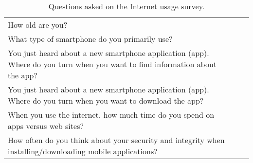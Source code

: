 \begin{table}[ht!]
    \centering
    \begin{tabularx}{0.9\textwidth} { 
        | >{\raggedright\arraybackslash}X 
        | >{\centering\arraybackslash}X 
        | >{\raggedleft\arraybackslash}X | }
        \hline
        How old are you? \\
        What type of smartphone do you primarily use? \\
        You just heard about a new smartphone application (app). Where do you turn when you want to find information about the app? \\
        You just heard about a new smartphone application (app). Where do you turn when you want to download the app? \\
        When you use the internet, how much time do you spend on apps versus web sites? \\
        How often do you think about your security and integrity when installing/downloading mobile applications? \\

        \hline
    \end{tabularx}
    \caption{\label{tab:survey-questions} Questions asked on the Internet usage survey.}
\end{table}